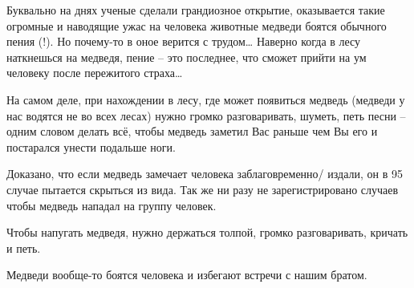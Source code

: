  
 
 
 
 


Буквально на днях ученые сделали грандиозное открытие, оказывается такие
огромные и наводящие ужас на человека животные медведи боятся обычного пения
(!). Но почему-то в оное верится с трудом… Наверно когда в лесу наткнешься на
медведя, пение – это последнее, что сможет прийти на ум человеку после
пережитого страха…

На самом деле, при нахождении в лесу, где может появиться медведь (медведи у
нас водятся не во всех лесах) нужно громко разговаривать, шуметь, петь песни –
одним словом делать всё, чтобы медведь заметил Вас раньше чем Вы его и
постарался унести подальше ноги.

Доказано, что если медведь замечает человека заблаговременно/ издали, он в 95%
случае пытается скрыться из вида. Так же ни разу не зарегистрировано случаев
чтобы медведь нападал на группу человек.

Чтобы напугать медведя, нужно держаться толпой, громко разговаривать, кричать и
петь.

Медведи вообще-то боятся человека и избегают встречи с нашим братом. 
